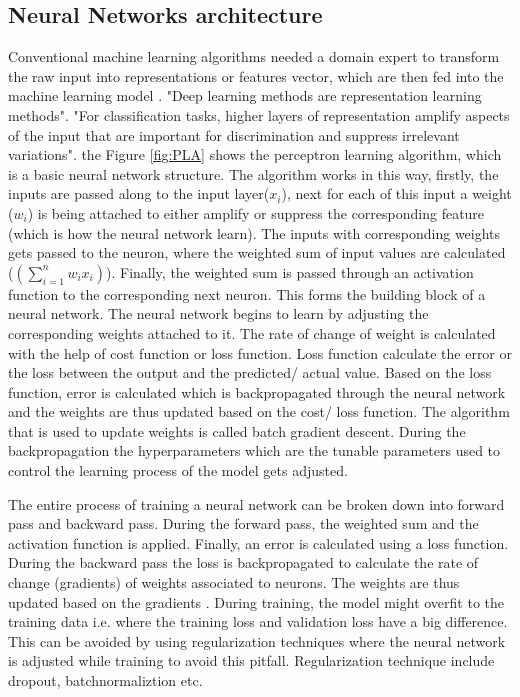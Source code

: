 \subsection{Neural Networks architecture}
Conventional machine learning algorithms needed a domain expert to transform the raw input into representations or features vector, which are then fed into the machine learning model \cite{lecun2015deep}. "Deep learning methods are representation learning methods"\cite{lecun2015deep}. "For classification tasks, higher layers of representation
amplify aspects of the input that are important for discrimination and
suppress irrelevant variations"\cite{lecun2015deep}. the Figure \ref{fig:PLA} shows the perceptron learning algorithm, which is a basic neural network structure. The algorithm works in this way, firstly, the inputs are passed along to the input layer($x_i$), next for each of this input  a weight ($w_i$) is being attached to either amplify or suppress the corresponding feature (which is how the neural network learn). The inputs with corresponding weights gets passed to the neuron, where the weighted sum of input values are calculated ($(\sum_{i=1}^{n}w_ix_i)$). Finally, the weighted sum is passed through an activation function to the corresponding next neuron. This forms the building block of a neural network. The neural network begins to learn by adjusting the corresponding weights attached to it.\cite{lecun2015deep} The rate of change of weight is calculated with the help of cost function or loss function. Loss function calculate the error or the loss between the output  and the predicted/ actual value. Based on the loss function, error is calculated which is backpropagated through the neural network and the weights are thus updated based on the cost/ loss function. The algorithm that is used to update weights is called batch gradient descent\cite{lecun2015deep}. During the backpropagation the hyperparameters which are the tunable parameters used to control the learning process of the model gets adjusted\cite{rumelhart1995backpropagation}.

The entire process of training a neural network can be broken down into forward pass and backward pass. During the forward pass, the weighted sum and the activation function is applied. Finally, an error is calculated using a loss function. During the backward pass the loss is backpropagated to calculate the rate of change (gradients)  of weights associated to neurons. The weights are thus updated based on the gradients \cite{rumelhart1995backpropagation}\cite{lecun2015deep}. During training, the model might overfit to the training data i.e. where the training loss and validation loss have a big difference. This can be avoided by using regularization techniques where the neural network is adjusted while training to avoid this pitfall\cite{girosi1995regularization}. Regularization technique include dropout, batchnormaliztion etc.






